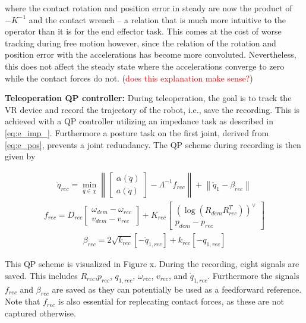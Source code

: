 \documentclass[a4paper, 10pt, conference]{ieeeconf}
\begin{document}
    where the contact rotation and position error in steady are now the product of $-K^{-1}$ and the contact wrench -- a relation that is much more intuitive to the operator than it is for the end effector task. This comes at the cost of worse tracking during free motion however, since the relation of the rotation and position error with the accelerations has become more convoluted. Nevertheless, this does not affect the steady state where the accelerations converge to zero while the contact forces do not. (\textcolor{red}{does this explanation make sense?})

    \textbf{Teleoperation QP controller:}
    During teleoperation, the goal is to track the VR device and record the trajectory of the robot, i.e., save the recording. This is achieved with a QP controller utilizing an impedance task as described in \eqref{eq:e_imp_}. Furthermore a posture task on the first joint, derived from \eqref{eq:e_pos}, prevents a joint redundancy. The QP scheme during recording is then given by

    \begin{align} \label{eq:qp_rec} 
    \ddot{q}_{rec} = \min\limits_{\ddot{q}\in\chi }\left \|  \begin{bmatrix}
    \alpha(\ddot{q})\\ 
    a(\ddot{q})
    \end{bmatrix} - \Lambda^{-1}f_{rec} \right \| + \left \| \ddot{q}_1-\beta_{rec} \right \|
      \end{align}
    \begin{align} 
    f_{rec} =D_{rec} \begin{bmatrix}
    \omega_{dem} - \omega_{rec}
    \\ 
    v_{dem}-v_{rec}
    \end{bmatrix} + K_{rec} \begin{bmatrix}
    (\log({R_{dem}}R_{rec}^T))^{\vee }\\
    p_{dem}-p_{rec}
    \end{bmatrix}
    \end{align}
    \begin{align} 
    \beta_{rec} = 2\sqrt{k_{rec}}\left [ -\dot{q}_{1,rec}  \right ] + k_{rec}\left [ -q_{1,rec}  \right ]
    \end{align}

    This QP scheme is visualized in Figure x. During the recording, eight signals are saved. This includes $R_{rec}$,$p_{rec}$, $q_{1,rec}$, $\omega_{rec}$, $v_{rec}$, and $\dot{q}_{1,rec}$. Furthermore the signals $f_{rec}$ and $\beta_{rec}$ are saved as they can potentially be used as a feedforward reference. Note that $f_{rec}$ is also essential for replecating contact forces, as these are not captured otherwise.
\end{document}

